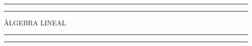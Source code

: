 \newcommand{\plogo}{\fbox{$\mathcal{PL}$}} %

\begin{titlepage} %
	
	\centering %
	
	\scshape %
	
	\vspace*{5\baselineskip} %
	
	
	\rule{\textwidth}{1.6pt}\vspace*{-\baselineskip}\vspace*{2pt} %
	\rule{\textwidth}{0.4pt} %
	
	\vspace{0.75\baselineskip} %
	
	{\LARGE ÀLGEBRA LINEAL\\} %
	
	\vspace{0.75\baselineskip} %
	
	\rule{\textwidth}{0.4pt}\vspace*{-\baselineskip}\vspace{3.2pt} %
	\rule{\textwidth}{1.6pt} %
	
	\vspace{1.5\baselineskip} %
	
	
	
	\vspace*{1\baselineskip} %
	
	
	
	
	\vspace{1\baselineskip} %
	

\end{titlepage}
